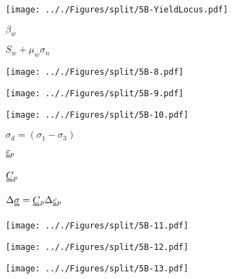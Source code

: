 \documentclass[onecolumn,11pt]{report}
\def\lthtmlcheckvsize{\ifdim\ht\sizebox<\vsize 
  \ifdim\wd\sizebox<\hsize\expandafter\hfill\fi \expandafter\vfill
  \else\expandafter\vss\fi}%
\begin{document}
{\newpage\clearpage
{}%
\texttt{[image: .././Figures/split/5B-YieldLocus.pdf]}%
\lthtmlpictureZ
\lthtmlcheckvsize\clearpage}

{\newpage\clearpage
{}%
$ \beta_w$%
\lthtmlindisplaymathZ
\lthtmlcheckvsize\clearpage}

{\newpage\clearpage
{}%
$ S_w + \mu_w \sigma_n$%
\lthtmlindisplaymathZ
\lthtmlcheckvsize\clearpage}

{\newpage\clearpage
{}%
\texttt{[image: .././Figures/split/5B-8.pdf]}%
\lthtmlpictureZ
\lthtmlcheckvsize\clearpage}

{\newpage\clearpage
{}%
\texttt{[image: .././Figures/split/5B-9.pdf]}%
\lthtmlpictureZ
\lthtmlcheckvsize\clearpage}

{\newpage\clearpage
{}%
\texttt{[image: .././Figures/split/5B-10.pdf]}%
\lthtmlpictureZ
\lthtmlcheckvsize\clearpage}

{\newpage\clearpage
{}%
$ \sigma_d = (\sigma_1 - \sigma_3)$%
\lthtmlindisplaymathZ
\lthtmlcheckvsize\clearpage}

{\newpage\clearpage
{}%
$ \uuline{\varepsilon}{}_p$%
\lthtmlindisplaymathZ
\lthtmlcheckvsize\clearpage}

{\newpage\clearpage
{}%
$ \uuline{C}{}_p$%
\lthtmlindisplaymathZ
\lthtmlcheckvsize\clearpage}

{\newpage\clearpage
{}%
$\displaystyle \Delta \uuline{\sigma} = \uuline{C}{}_p \Delta \uuline{\varepsilon}{}_p$%
\lthtmlindisplaymathZ
\lthtmlcheckvsize\clearpage}

{\newpage\clearpage
{}%
\texttt{[image: .././Figures/split/5B-11.pdf]}%
\lthtmlpictureZ
\lthtmlcheckvsize\clearpage}

{\newpage\clearpage
{}%
\texttt{[image: .././Figures/split/5B-12.pdf]}%
\lthtmlpictureZ
\lthtmlcheckvsize\clearpage}

{\newpage\clearpage
{}%
\texttt{[image: .././Figures/split/5B-13.pdf]}%
\lthtmlpictureZ
\lthtmlcheckvsize\clearpage}
\end{document}
